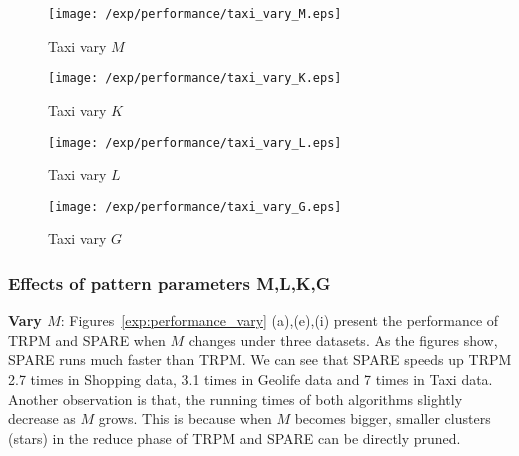 \begin{figure*}[t]
    \begin{subfigure}[b]{0.23\textwidth}
        \texttt{[image: /exp/performance/taxi\_vary\_M.eps]}
        \caption{Taxi vary $M$}
    \end{subfigure}
    \begin{subfigure}[b]{0.23\textwidth}
        \texttt{[image: /exp/performance/taxi\_vary\_K.eps]}
        \caption{Taxi vary $K$}
    \end{subfigure}
    \begin{subfigure}[b]{0.23\textwidth}
        \texttt{[image: /exp/performance/taxi\_vary\_L.eps]}
        \caption{Taxi vary $L$}
    \end{subfigure}
       \begin{subfigure}[b]{0.23\textwidth}
        \texttt{[image: /exp/performance/taxi\_vary\_G.eps]}
        \caption{Taxi vary $G$}
    \end{subfigure}       
\caption{Performance of SPARE and TRPM on real datasets under different pattern parameters.}
\label{exp:performance_vary}
\end{figure*}


\subsubsection{Effects of pattern parameters M,L,K,G}
\textbf{Vary $M$}: Figures~\ref{exp:performance_vary} (a),(e),(i)
present the performance of TRPM and SPARE when $M$ changes under three datasets.
As the figures show, SPARE runs much faster than TRPM. We can see that SPARE
speeds up TRPM 2.7 times in Shopping data, 3.1 times in Geolife data and
7 times in Taxi data. Another observation is that, the running times
of both algorithms slightly decrease as $M$ grows. This is
because when $M$ becomes bigger, smaller clusters (stars) in 
the reduce phase of TRPM and SPARE can be directly pruned.


